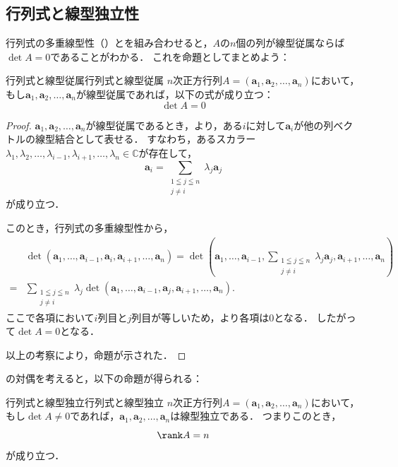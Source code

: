 \subsection{行列式と線型独立性}

行列式の多重線型性（）とを組み合わせると，$A$の$n$個の列が線型従属ならば$\det A =0$であることがわかる．
これを命題としてまとめよう：

\begin{prop}{行列式と線型従属}{行列式と線型従属}
  $n$次正方行列$A = (\bm{a}_1, \bm{a}_2, \dots, \bm{a}_n)$において，もし$\bm{a}_1, \bm{a}_2, \dots, \bm{a}_n$が線型従属であれば，以下の式が成り立つ：
  \[
  \det A = 0
  \]
\end{prop}

\begin{leftbar}
\begin{proof}
  $\bm{a}_1, \bm{a}_2, \dots, \bm{a}_n$が線型従属であるとき，より，ある$i$に対して$\bm{a}_i$が他の列ベクトルの線型結合として表せる．
  すなわち，あるスカラー$\lambda_1, \lambda_2, \dots, \lambda_{i-1}, \lambda_{i+1}, \dots, \lambda_n \in \mathbb{C}$が存在して，
  \[
  \bm{a}_i = \sum_{\substack{1\leqq j\leqq n\\ j \ne i}} \lambda_j \bm{a}_j
  \]
  が成り立つ．

  このとき，行列式の多重線型性から，
  \begin{align*} 
    &\det(\bm{a}_1, \dots, \bm{a}_{i-1}, \bm{a}_i, \bm{a}_{i+1}, \dots, \bm{a}_n)  = \det(\bm{a}_1, \dots, \bm{a}_{i-1}, \sum_{\substack{1\leqq j\leqq n\\ j \ne i}} \lambda_j \bm{a}_j, \bm{a}_{i+1}, \dots, \bm{a}_n) \\
    =& \sum_{\substack{1\leqq j\leqq n\\ j\ne i}} \lambda_j \det(\bm{a}_1, \dots, \bm{a}_{i-1}, \bm{a}_j, \bm{a}_{i+1}, \dots, \bm{a}_n).
  \end{align*}
  ここで各項において$i$列目と$j$列目が等しいため，より各項は$0$となる．
  したがって$\det A = 0$となる．
  
  以上の考察により，命題が示された．
\end{proof}
\end{leftbar}

の対偶を考えると，以下の命題が得られる：

\begin{prop}{行列式と線型独立}{行列式と線型独立}
  $n$次正方行列$A = (\bm{a}_1, \bm{a}_2, \dots, \bm{a}_n)$において，もし$\det A \ne 0$であれば，$\bm{a}_1, \bm{a}_2, \dots, \bm{a}_n$は線型独立である．
  つまりこのとき，
  \[
  \rank A = n
  \]
  が成り立つ．
\end{prop}

